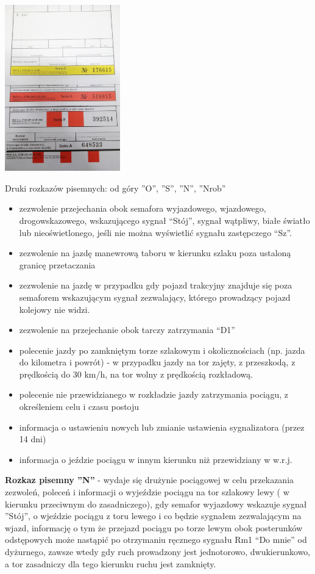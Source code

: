 	\begin{marginfigure}
		\includegraphics[width=5cm]{skryptkierownik-img/rozkazy-pisemne.jpg}
		\caption{Druki rozkazów pisemnych: od góry ''O'', ''S'', ''N'', ''Nrob''}
	\end{marginfigure}
\begin{itemize}
\item zezwolenie przejechania obok semafora wyjazdowego, wjazdowego, drogowskazowego, wskazującego sygnał “Stój”, sygnał
wątpliwy, białe światło lub nieoświetlonego, jeśli nie można wyświetlić sygnału zastępczego “Sz”.
\item zezwolenie na jazdę manewrową taboru w kierunku szlaku poza ustaloną granicę przetaczania
\item zezwolenie na jazdę w przypadku gdy pojazd trakcyjny znajduje się poza semaforem wskazującym sygnał zezwalający,
którego prowadzący pojazd kolejowy nie widzi.
\item zezwolenie na przejechanie obok tarczy zatrzymania “D1”
\item polecenie jazdy po zamkniętym torze szlakowym i okolicznościach (np. jazda do kilometra i powrót) - w przypadku jazdy na tor zajęty, z przeszkodą, z prędkością do 30 km/h, na tor wolny z prędkością rozkładową.
\item polecenie nie przewidzianego w rozkładzie jazdy zatrzymania pociągu, z określeniem celu i czasu postoju
\item informacja o ustawieniu nowych lub zmianie ustawienia sygnalizatora (przez 14 dni)
\item informacja o jeździe pociągu w innym kierunku niż przewidziany w w.r.j.
\end{itemize}

\textbf{Rozkaz pisemny ''N'' } - wydaje się drużynie pociągowej w celu przekazania zezwoleń, poleceń i informacji o wyjeździe pociągu na tor szlakowy lewy ( w kierunku przeciwnym do zasadniczego), gdy semafor wyjazdowy wskazuje sygnał ''Stój'', o wjeździe pociągu z toru lewego i co będzie sygnałem zezwalającym na wjazd, informację o tym że przejazd pociągu po torze lewym obok posterunków odstępowych może nastąpić po otrzymaniu ręcznego sygnału Rm1 “Do mnie” od dyżurnego, zawsze wtedy gdy ruch prowadzony jest jednotorowo, dwukierunkowo, a tor zasadniczy dla tego kierunku ruchu  jest zamknięty.

